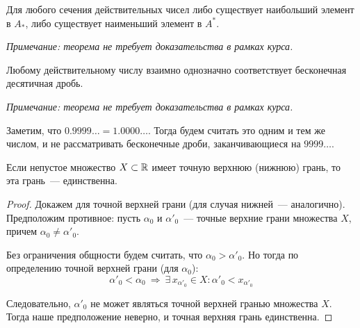 \begin{theorem}
Для любого сечения действительных чисел либо существует наибольший элемент в \(A_{*}\),
либо существует наименьший элемент в \(A^{*}\).

\vspace{2mm}

\textit{Примечание: теорема не требует доказательства в рамках курса.}
\end{theorem}

\begin{theorem}
Любому действительному числу взаимно однозначно соответствует бесконечная десятичная дробь.

\vspace{2mm}

\textit{Примечание: теорема не требует доказательства в рамках курса.}
\end{theorem}

\begin{note}
Заметим, что \(0.9999\ldots=1.0000\ldots\). Тогда будем считать это одним и тем же числом,
и не рассматривать бесконечные дроби, заканчивающиеся на \(9999\ldots\).
\end{note}


\begin{theorem}
Если непустое множество \(X\subset\mathbb{R}\) имеет точную верхнюю (нижнюю) грань, то эта грань~--- единственна.

\begin{proof}
Докажем для точной верхней грани (для случая нижней~--- аналогично).\\
Предположим противное: пусть \(\alpha_{0}\) и \(\alpha'_{0}\)~---
точные верхние грани множества \(X\), причем \(\alpha_{0}\neq\alpha'_{0}\).

Без ограничения общности будем считать, что \(\alpha_{0}>\alpha'_{0}\).
Но тогда по определению точной верхней грани (для \(\alpha_{0}\)):
\[
\alpha'_{0} < \alpha_{0} ~ \Rightarrow ~ \exists\,x_{\alpha'_{0}}\in X:
\alpha'_{0} < x_{\alpha'_{0}}
\]

Следовательно, \(\alpha'_{0}\) не может являться точной верхней гранью множества \(X\).
Тогда наше предположение неверно, и точная верхняя грань единственна.
\end{proof}
\end{theorem}

